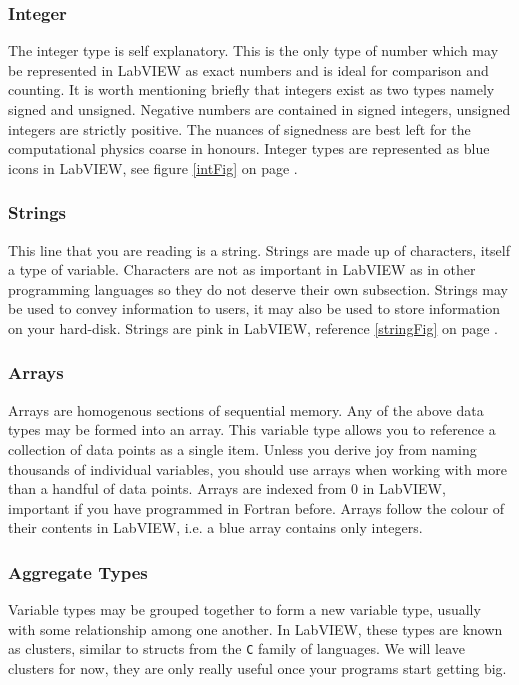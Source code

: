	\subsubsection{Integer}
	The integer type is self explanatory. This is the only type of number which may be represented in LabVIEW as exact numbers and is ideal for comparison and counting. It is worth mentioning briefly that integers exist as two types namely signed and unsigned. Negative numbers are contained in signed integers, unsigned integers are strictly positive. The nuances of signedness are best left for the computational physics coarse in honours. Integer types are represented as blue icons in LabVIEW, see figure \ref{intFig} on page \pageref{intFig}.
	\subsubsection{Strings}
	This line that you are reading is a string. Strings are made up of characters, itself a type of variable. Characters are not as important in LabVIEW as in other programming languages so they do not deserve their own subsection. Strings may be used to convey information to users, it may also be used to store information on your hard-disk. Strings are pink in LabVIEW, reference \ref{stringFig} on page \pageref{stringFig}.
	\subsubsection{Arrays}
	Arrays are homogenous sections of sequential memory. Any of the above data types may be formed into an array. This variable type allows you to reference a collection of data points as a single item. Unless you derive joy from naming thousands of individual variables, you should use arrays when working with more than a handful of data points. Arrays are indexed from 0 in LabVIEW, important if you have programmed in Fortran before. Arrays follow the colour of their contents in LabVIEW, i.e. a blue array contains only integers.
	\subsubsection{Aggregate Types}
	Variable types may be grouped together to form a new variable type, usually with some relationship among one another. In LabVIEW, these types are known as clusters, similar to structs from the \texttt{C} family of languages. We will leave clusters for now, they are only really useful once your programs start getting big.\\
	
